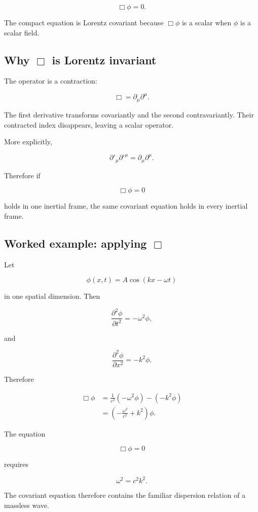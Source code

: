 \[
\boxed{
\Box\phi=0
}.
\]

The compact equation is Lorentz covariant because \(\Box\phi\) is a scalar when \(\phi\) is a scalar field.

\subsection{Why \(\Box\) is Lorentz invariant}

The operator is a contraction:

\[
\Box
=
\partial_{\mu}\partial^{\mu}.
\]

The first derivative transforms covariantly and the second contravariantly. Their contracted index disappears, leaving a scalar operator.

More explicitly,

\[
\partial'_{\mu}\partial'^{\mu}
=
\partial_{\mu}\partial^{\mu}.
\]

Therefore if

\[
\Box\phi=0
\]

holds in one inertial frame, the same covariant equation holds in every inertial frame.

\subsection{Worked example: applying \(\Box\)}

Let

\[
\phi(x,t)
=
A\cos(kx-\omega t)
\]

in one spatial dimension. Then

\[
\frac{\partial^{2}\phi}{\partial t^{2}}
=
-\omega^{2}\phi,
\]

and

\[
\frac{\partial^{2}\phi}{\partial x^{2}}
=
-k^{2}\phi.
\]

Therefore

\[
\begin{aligned}
\Box\phi
&=
\frac{1}{c^{2}}
(-\omega^{2}\phi)
-
(-k^{2}\phi)\\
&=
\left(
-\frac{\omega^{2}}{c^{2}}
+k^{2}
\right)
\phi.
\end{aligned}
\]

The equation

\[
\Box\phi=0
\]

requires

\[
\boxed{
\omega^{2}=c^{2}k^{2}
}.
\]

The covariant equation therefore contains the familiar dispersion relation of a massless wave.

